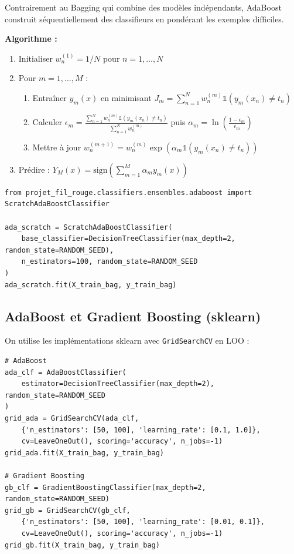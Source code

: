 \documentclass{name}
\begin{document}
Contrairement au Bagging qui combine des modèles indépendants, AdaBoost construit séquentiellement des classifieurs en pondérant les exemples difficiles.

\textbf{Algorithme :}
\begin{enumerate}
    \item Initialiser $w_n^{(1)} = 1/N$ pour $n = 1, \dots, N$
    \item Pour $m = 1, \dots, M$ :
    \begin{enumerate}
        \item Entraîner $y_m(x)$ en minimisant $J_m = \sum_{n=1}^N w_n^{(m)} \mathbb{1}(y_m(x_n) \neq t_n)$
        \item Calculer $\epsilon_m = \frac{\sum_{n=1}^N w_n^{(m)} \mathbb{1}(y_m(x_n) \neq t_n)}{\sum_{n=1}^N w_n^{(m)}}$ \quad puis \quad $\alpha_m = \ln\left(\frac{1 - \epsilon_m}{\epsilon_m}\right)$
        \item Mettre à jour $w_n^{(m+1)} = w_n^{(m)} \exp\left(\alpha_m \mathbb{1}(y_m(x_n) \neq t_n)\right)$
    \end{enumerate}
    \item Prédire : $Y_M(x) = \text{sign}\left(\sum_{m=1}^M \alpha_m y_m(x)\right)$
\end{enumerate}

\begin{lstlisting}[caption={AdaBoost from scratch via l'API}]
from projet_fil_rouge.classifiers.ensembles.adaboost import ScratchAdaBoostClassifier

ada_scratch = ScratchAdaBoostClassifier(
    base_classifier=DecisionTreeClassifier(max_depth=2, random_state=RANDOM_SEED),
    n_estimators=100, random_state=RANDOM_SEED
)
ada_scratch.fit(X_train_bag, y_train_bag)
\end{lstlisting}

\subsection{AdaBoost et Gradient Boosting (sklearn)}

On utilise les implémentations sklearn avec \texttt{GridSearchCV} en LOO :

\begin{lstlisting}[caption={AdaBoost et Gradient Boosting sklearn avec GridSearchCV}]
# AdaBoost
ada_clf = AdaBoostClassifier(
    estimator=DecisionTreeClassifier(max_depth=2), random_state=RANDOM_SEED
)
grid_ada = GridSearchCV(ada_clf, 
    {'n_estimators': [50, 100], 'learning_rate': [0.1, 1.0]},
    cv=LeaveOneOut(), scoring='accuracy', n_jobs=-1)
grid_ada.fit(X_train_bag, y_train_bag)

# Gradient Boosting
gb_clf = GradientBoostingClassifier(max_depth=2, random_state=RANDOM_SEED)
grid_gb = GridSearchCV(gb_clf,
    {'n_estimators': [50, 100], 'learning_rate': [0.01, 0.1]},
    cv=LeaveOneOut(), scoring='accuracy', n_jobs=-1)
grid_gb.fit(X_train_bag, y_train_bag)
\end{lstlisting}
\end{document}
